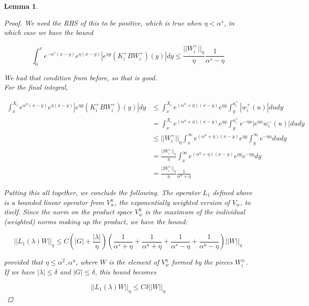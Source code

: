 \documentclass[12pt]{article}
\newtheorem{lemma}{Lemma}
\begin{document}
\begin{lemma}
\begin{proof}
We need the RHS of this to be positive, which is true when $\eta < \alpha^s$, in which case we have the bound

\[  
\int_0^x e^{-\alpha^s (x-y)}e^{\eta(x-y)}|e^{\eta y} (K_i^+ B W_i^+)(y)| dy \leq
\frac{||W_i^+||_\eta}{\eta} \frac{1}{\alpha^s - \eta} 
\]

We had that condition from before, so that is good.\\

For the final integral,

\begin{align*}
\int_x^{X_i} e^{\alpha^u (x-y)}e^{\eta(x-y)}|e^{\eta y} (K_i^+ B W_i^+)(y)| dy &\leq \int_x^{X_i} e^{(\alpha^u + \eta)(x-y)}e^{\eta y} \int_y^{a_i^+} |w_i^+(u)| du dy \\
&= \int_x^{X_i} e^{(\alpha^u + \eta)(x-y)}e^{\eta y} \int_y^{a_i^+} e^{-\eta u} |e^{\eta u} w_i^-(u)| du dy \\
&\leq ||W_i^+||_\eta \int_x^\infty e^{(\alpha^u + \eta)(x-y)}e^{\eta y} \int_y^\infty e^{-\eta u} du dy \\
&= \frac{||W_i^+||_\eta}{\eta} \int_x^\infty e^{(\alpha^u + \eta)(x-y)}e^{\eta y} e^{-\eta y} dy \\
&= \frac{||W_i^+||_\eta}{\eta} \frac{1}{\alpha^u + \eta}
\end{align*}

Putting this all together, we conclude the following. The operator $L_1$ defined above is a bounded linear operator from $V_w^\eta$, the exponentially weighted version of $V_w$, to itself. Since the norm on the product space $V_w^\eta$ is the maximum of the individual (weighted) norms making up the product, we have the bound:

\begin{equation}
	||L_1(\lambda)W||_\eta \leq C\left(|G| + \frac{|\lambda|}{\eta}\right)\left(\frac{1}{\alpha^s + \eta} + \frac{1}{\alpha^u + \eta} + \frac{1}{\alpha^s - \eta} + \frac{1}{\alpha^u - \eta}\right)||W||_\eta
\end{equation}

provided that $\eta \leq \alpha^2, \alpha^u$, where $W$ is the element of $V_w^\eta$ formed by the pieces $W_i^\pm$. If we have $|\lambda| \leq \delta$ and $|G| \leq \delta$, this bound becomes

\begin{equation}
	||L_1(\lambda)W||_\eta \leq C \delta ||W||_\eta
\end{equation}

\end{proof}
\end{lemma}
\end{document}
